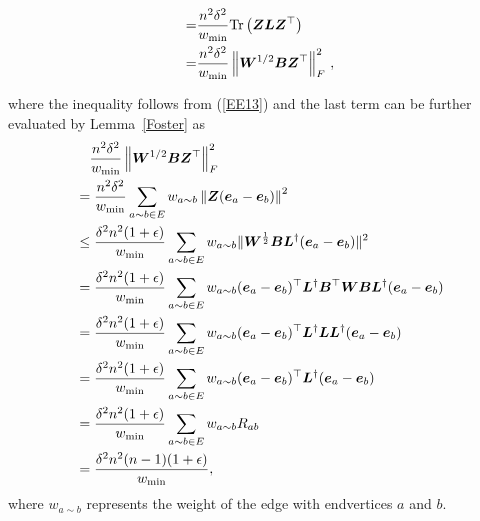 \documentclass[10pt,twocolumn,twoside]{IEEEtran}
\begin{document}
\begin{IEEEproof}
\begin{small}
\begin{align*}
            =   & \frac{n^2\delta^2}{w_{\min}}  \mathrm{Tr}\left(\boldsymbol{Z}\boldsymbol{L}\boldsymbol{Z}^{\top}\right)                                         \\
            =   & \frac{n^2\delta^{2}}{w_{\min}} \left\Vert\boldsymbol{W}^{1/2} \boldsymbol{B} \boldsymbol{Z}^{\top}\right\Vert_{F}^{2}\,,
        \end{align*}
    \end{small}
    where the  inequality follows from (\ref{EE13}) and the last term can be further evaluated by Lemma~\ref {Foster} as
    \begin{align*}
         & \quad \frac{n^2\delta^2}{w_{\min}} \left\Vert\boldsymbol{W}^{1/2} \boldsymbol{B} \boldsymbol{Z}^{\top}\right\Vert_{F}^{2}                                            \\
         & =\frac{n^2\delta^{2}}{w_{\min}}
        \sum_{a\sim b \in E} w_{a\sim b} \left\Vert\boldsymbol{Z} (\boldsymbol{e}_{a} - \boldsymbol{e}_{b})\right\Vert^{2}                                                      \\
         & \leq
        \frac{\delta^{2}n^2 (1+\epsilon)}{w_{\min}}
        \sum_{a\sim b \in E} w_{a\sim b}\|\boldsymbol{W}^{\frac{1}{2}} \boldsymbol{B} \boldsymbol{L}^{\dagger} (\boldsymbol{e}_a-\boldsymbol{e}_b)\|^2                              \\
         & =
        \frac{\delta^{2}n^2 (1+\epsilon)}{w_{\min}}
        \sum_{a\sim b \in E} w_{a\sim b}(\boldsymbol{e}_a-\boldsymbol{e}_b)^\top \boldsymbol{L}^{\dagger} \boldsymbol{B}^\top \boldsymbol{W} \boldsymbol{B} \boldsymbol{L}^{\dagger} (\boldsymbol{e}_a-\boldsymbol{e}_b) \\
         & =
        \frac{\delta^{2}n^2 (1+\epsilon)}{w_{\min}}
        \sum_{a\sim b \in E} w_{a\sim b}(\boldsymbol{e}_a-\boldsymbol{e}_b)^\top \boldsymbol{L}^{\dagger} \boldsymbol{L} \boldsymbol{L}^{\dagger} (\boldsymbol{e}_a-\boldsymbol{e}_b)                   \\
         & =
        \frac{\delta^{2}n^2 (1+\epsilon)}{w_{\min}}
        \sum_{a\sim b \in E} w_{a\sim b}(\boldsymbol{e}_a-\boldsymbol{e}_b)^\top \boldsymbol{L}^{\dagger} (\boldsymbol{e}_a-\boldsymbol{e}_b)                                       \\
         & =
        \frac{\delta^{2} n^2 (1+\epsilon)}{w_{\min}}
        \sum_{a\sim b \in E} w_{a\sim b} R_{ab}                                                                                       \\
         & =\frac{\delta^{2} n^2(n-1) (1+\epsilon)}{w_{\min}},
    \end{align*}
    where $w_{a\sim b}$ represents the weight of the edge with endvertices $a$ and $b$.


\end{IEEEproof}
\end{document}
